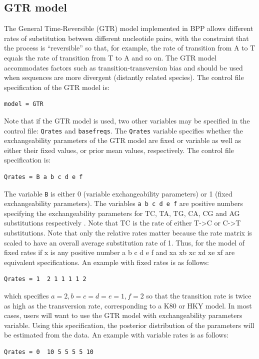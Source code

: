 \documentclass[a4paper]{book}
\numberwithin{equation}{section} \renewcommand{\baselinestretch}{0.55}
\begin{document}
\subsection{GTR model}
The General Time-Reversible (GTR) model implemented in BPP
allows different rates of substitution between different nucleotide
pairs, with the constraint that the process is ``reversible'' so that,
for example, the rate of transition from A to T equals the rate of
transition from T to A and so on.  The GTR model accommodates factors
such as transition-transversion bias and should be used when sequences
are more divergent (distantly related species). The control file
specification of the GTR model is:
\begin{verbatim}
model = GTR
\end{verbatim}
Note that if the GTR model is used, two other variables may be
specified in the control file: \texttt{Qrates} and
\texttt{basefreqs}. The \texttt{Qrates} variable specifies whether the
exchangeability parameters of the GTR model are fixed or variable as
well as either their fixed values, or prior mean values,
respectively. The control file specification is:
\begin{verbatim}
Qrates = B a b c d e f
\end{verbatim}
The variable \texttt{B} is either 0 (variable exchangeability
parameters) or 1 (fixed exchangeability parameters).  The variables
\texttt{a b c d e f} are positive numbers specifying the
exchangeability parameters for TC, TA, TG, CA, CG and AG substitutions
respectively \cite[see][]{Yang1994a}. Note that TC is the rate of
either T->C or C->T substitutions.  Note that only the relative rates
matter because the rate matrix is scaled to have an overall average
substitution rate of 1. Thus, for the model of fixed rates if x is any
positive number a b c d e f and xa xb xc xd xe xf are equivalent
specifications.  An example with fixed rates is as follows:
\begin{verbatim}
Qrates = 1  2 1 1 1 1 2
\end{verbatim}
which specifies $a=2,b=c=d=e=1,f=2$ so that the transition rate is
twice as high as the transversion rate, corresponding to a K80 or HKY
model.  In most cases, users will want to use the GTR model with
exchangeability parameters variable. Using this specification, the
posterior distribution of the parameters will be estimated from the
data.  An example with variable rates is as follows:
\begin{verbatim}
Qrates = 0  10 5 5 5 5 10
\end{verbatim}
\end{document}
